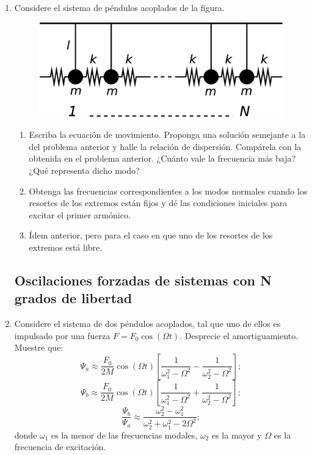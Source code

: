 \documentclass[11pt,spanish,a4paper]{article}
\begin{document}
\begin{enumerate}
\item Considere el sistema de péndulos acoplados de la figura. 
\begin{figure}[H]
	\centering{}\includegraphics[clip,scale=0.25]{ej1-12}
\end{figure}
\begin{enumerate}
	\item Escriba la ecuación de movimiento. Proponga una solución semejante a la del problema anterior y halle la relación de dispersión. Compárela con la obtenida en el problema anterior.
	¿Cuánto vale la frecuencia más baja?
	¿Qué representa dicho modo? 
	\item Obtenga las frecuencias correspondientes a los modos normales cuando los resortes de los extremos están fijos y dé las condiciones iniciales para excitar el primer armónico. 
	\item Ídem anterior, pero para el caso en que uno de los resortes de los extremos está libre. 
\end{enumerate}



\subsection*{Oscilaciones forzadas de sistemas con N grados de libertad}

\item Considere el sistema de dos péndulos acoplados, tal que uno de ellos es impulsado por una fuerza $F= F_0 \cos(\Omega t)$.
Desprecie el amortiguamiento.
Muestre que:
\[
\Psi_a \approx \frac{F_0}{2M} \cos(\Omega t) \left[\frac{1}{\omega_1^2- \Omega^2} - \frac{1}{\omega_2^2- \Omega^2}\right];
\]
\[
\Psi_b \approx \frac{F_0}{2M} \cos(\Omega t) \left[\frac{1}{\omega_1^2- \Omega^2} + \frac{1}{\omega_2^2- \Omega^2}\right];
\]
\[
\frac{\Psi_b}{\Psi_a} \approx \frac{\omega_2^2- \omega_1^2}{\omega_2^2+ \omega_1^2- 2 \Omega^2};
\]
donde $\omega_{1}$ es la menor de las frecuencias modales, $\omega_2$ es la mayor y $\Omega$ es la frecuencia de excitación.




\end{enumerate}
\end{document}
